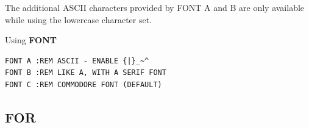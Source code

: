 \begin{description}[leftmargin=2cm,style=nextline]
\item [Remarks:] The additional ASCII characters provided by FONT A and B are only available
  while using the lowercase character set.

\item [Examples:] Using {\bf FONT}
\begin{tcolorbox}[colback=black,coltext=white]
\begin{verbatim}
FONT A :REM ASCII - ENABLE {|}_~^
FONT B :REM LIKE A, WITH A SERIF FONT
FONT C :REM COMMODORE FONT (DEFAULT)
\end{verbatim}
\end{tcolorbox}
\end{description}


\newpage
\subsection{FOR}
